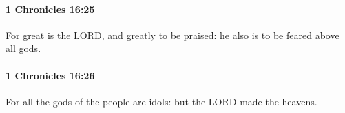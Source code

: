 		\paragraph{1 Chronicles 16:25} %
			\label{1CHRONICLES-16-25}

			For great is the LORD, and greatly to be praised: he also is to be feared above all gods.


		\paragraph{1 Chronicles 16:26} %
			\label{1CHRONICLES-16-26}

			For all the gods of the people are idols: but the LORD made the heavens.


